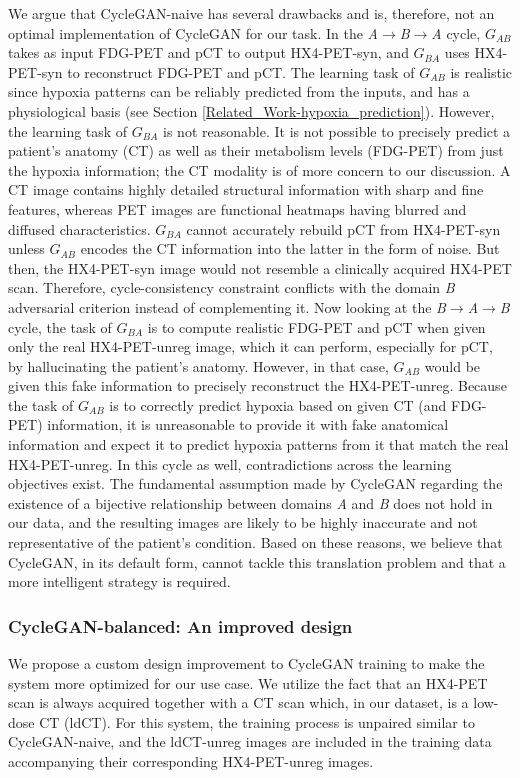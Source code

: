We argue that CycleGAN-naive has several drawbacks and is, therefore, not an optimal implementation of CycleGAN for our task. In the \textit{A}$\rightarrow$\textit{B}$\rightarrow$\textit{A} cycle, $G_{AB}$ takes as input FDG-PET and pCT to output HX4-PET-syn, and $G_{BA}$ uses HX4-PET-syn to reconstruct FDG-PET and pCT. The learning task of $G_{AB}$ is realistic since hypoxia patterns can be reliably predicted from the inputs, and has a physiological basis (see Section \ref{Related_Work-hypoxia_prediction}). However, the learning task of $G_{BA}$ is not reasonable. It is not possible to precisely predict a patient's anatomy (CT) as well as their metabolism levels (FDG-PET) from just the hypoxia information; the CT modality is of more concern to our discussion. A CT image contains highly detailed structural information with sharp and fine features, whereas PET images are functional heatmaps having blurred and diffused characteristics. $G_{BA}$ cannot accurately rebuild pCT from HX4-PET-syn unless $G_{AB}$ encodes the CT information into the latter in the form of noise. But then, the HX4-PET-syn image would not resemble a clinically acquired HX4-PET scan. Therefore, cycle-consistency constraint conflicts with the domain \textit{B} adversarial criterion instead of complementing it. Now looking at the \textit{B}$\rightarrow$\textit{A}$\rightarrow$\textit{B} cycle, the task of $G_{BA}$ is to compute realistic FDG-PET and pCT when given only the real HX4-PET-unreg image, which it can perform, especially for pCT, by hallucinating the patient's anatomy. However, in that case, $G_{AB}$ would be given this fake information to precisely reconstruct the HX4-PET-unreg. Because the task of $G_{AB}$ is to correctly predict hypoxia based on given CT (and FDG-PET) information, it is unreasonable to provide it with fake anatomical information and expect it to predict hypoxia patterns from it that match the real HX4-PET-unreg. In this cycle as well, contradictions across the learning objectives exist. The fundamental assumption made by CycleGAN regarding the existence of a bijective relationship between domains \textit{A} and \textit{B} does not hold in our data, and the resulting images are likely to be highly inaccurate and not representative of the patient's condition. Based on these reasons, we believe that CycleGAN, in its default form, cannot tackle this translation problem and that a more intelligent strategy is required.


\subsubsection{CycleGAN-balanced: An improved design}
We propose a custom design improvement to CycleGAN training to make the system more optimized for our use case. We utilize the fact that an HX4-PET scan is always acquired together with a CT scan which, in our dataset, is a low-dose CT (ldCT). For this system, the training process is unpaired similar to CycleGAN-naive, and the ldCT-unreg images are included in the training data accompanying their corresponding HX4-PET-unreg images. 


